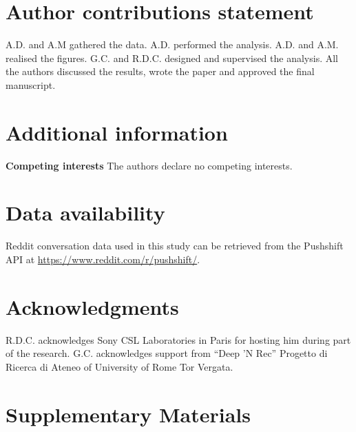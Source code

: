 \documentclass[fleqn,10pt]{wlscirep}
\begin{document}


\section*{Author contributions statement}
%
A.D. and A.M gathered the data.
A.D. performed the analysis.
A.D. and A.M. realised the figures.
G.C. and R.D.C. designed and supervised the analysis.
All the authors discussed the results, wrote the paper and approved the final manuscript.
%
\section*{Additional information}
\textbf{Competing interests} The authors declare no competing interests. 
%
\section*{Data availability}
Reddit conversation data used in this study can be retrieved from the Pushshift API at \url{https://www.reddit.com/r/pushshift/}.
%
\section*{Acknowledgments}
R.D.C. acknowledges Sony CSL Laboratories in Paris for hosting him during part of the research.
G.C. acknowledges support from “Deep ’N Rec” Progetto di Ricerca di Ateneo of University of Rome Tor Vergata. 
%
%
%
\pagebreak[2]
\clearpage
\renewcommand{\figurename}{Supplementary Figure}
\renewcommand{\tablename}{Supplementary Table}
\setcounter{figure}{0}
\renewcommand\thesection{Supplementary Note~\arabic{section}}
%
\section*{Supplementary Materials}
\end{document}
